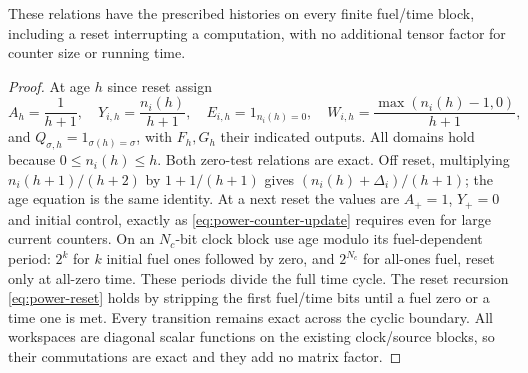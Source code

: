 \begin{proposition}\label{prop:power-counter-models}
These relations have the prescribed histories on every finite fuel/time block, including a reset interrupting a computation, with no additional tensor factor for counter size or running time.
\end{proposition}
\begin{proof}
At age $h$ since reset assign
\[
 A_h=\frac1{h+1},\quad Y_{i,h}=\frac{n_i(h)}{h+1},\quad
 E_{i,h}=1_{n_i(h)=0},\quad W_{i,h}=\frac{\max(n_i(h)-1,0)}{h+1},
\]
and $Q_{\sigma,h}=1_{\sigma(h)=\sigma}$, with $F_h,G_h$ their indicated outputs. All domains hold because $0\le n_i(h)\le h$. Both zero-test relations are exact. Off reset, multiplying $n_i(h+1)/(h+2)$ by $1+1/(h+1)$ gives $(n_i(h)+\Delta_i)/(h+1)$; the age equation is the same identity. At a next reset the values are $A_+=1$, $Y_+=0$ and initial control, exactly as \eqref{eq:power-counter-update} requires even for large current counters.
On an $N_c$-bit clock block use age modulo its fuel-dependent period: $2^k$ for $k$ initial fuel ones followed by zero, and $2^{N_c}$ for all-ones fuel, reset only at all-zero time. These periods divide the full time cycle. The reset recursion \eqref{eq:power-reset} holds by stripping the first fuel/time bits until a fuel zero or a time one is met. Every transition remains exact across the cyclic boundary. All workspaces are diagonal scalar functions on the existing clock/source blocks, so their commutations are exact and they add no matrix factor.
\end{proof}


